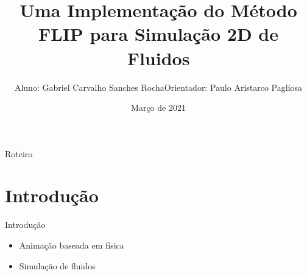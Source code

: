 \documentclass[aspectratio=169,xcolor=dvipsnames]{beamer}
\title[title]{Uma Implementação do Método FLIP para Simulação 2D de Fluidos}
\author[names] {Aluno: Gabriel Carvalho Sanches Rocha\newline{}Orientador: Paulo Aristarco Pagliosa}
\institute[FACOM] %
{
    Universidade Federal do Mato Grosso do Sul
    \vskip 3pt
}
\date{Março de 2021} %
\begin{document}
\begin{frame}
    \titlepage
\end{frame}

\begin{frame}{Roteiro}
    \tableofcontents
\end{frame}

\section{Introdução}

\begin{frame}{Introdução}
    \begin{itemize}[<+->]
        \item Animação baseada em física
        \item Simulação de fluidos
    \end{itemize}
\end{frame}
\end{document}
